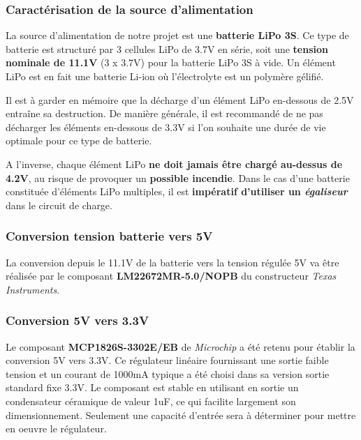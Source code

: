 \documentclass[a4paper,12pt]{report}
\begin{document}
			\subsubsection{Caractérisation de la source d'alimentation}
			
			La source d'alimentation de notre projet est une \textbf{batterie LiPo 3S}. Ce type de batterie est structuré par 3 cellules LiPo de 3.7V en série, soit une \textbf{tension nominale de 11.1V} (3 x 3.7V) pour la batterie LiPo 3S à vide. Un élément LiPo est en fait une batterie Li-ion où l'électrolyte est un polymère gélifié.
			
			Il est à garder en mémoire que la décharge d'un élément LiPo en-dessous de 2.5V entraîne sa destruction. De manière générale, il est recommandé de ne pas décharger les éléments en-dessous de 3.3V si l'on souhaite une durée de vie optimale pour ce type de batterie. 
			
		A l'inverse, chaque élément LiPo \textbf{ne doit jamais être chargé au-dessus de 4.2V}, au risque de provoquer un \textbf{possible incendie}. Dans le cas d'une batterie constituée d'éléments LiPo multiples, il est \textbf{impératif d'utiliser un \textit{égaliseur}} dans le circuit de charge.
		
			
			\subsubsection{Conversion tension batterie vers 5V}
				
			La conversion depuis le 11.1V de la batterie vers la tension régulée 5V va être réalisée par le composant \textbf{LM22672MR-5.0/NOPB} du constructeur \textit{Texas Instruments}.
			
			\subsubsection{Conversion 5V vers 3.3V}
			
			Le composant \textbf{MCP1826S-3302E/EB} de \textit{Microchip} a été retenu pour établir la conversion 5V vers 3.3V. Ce régulateur linéaire fournissant une sortie faible tension et un courant de 1000mA typique a été choisi dans sa version sortie standard fixe 3.3V. Le composant est stable en utilisant en sortie un condensateur céramique de valeur 1uF, ce qui facilite largement son dimensionnement. Seulement une capacité d'entrée sera à déterminer pour mettre en oeuvre le régulateur.
				
\end{document}
